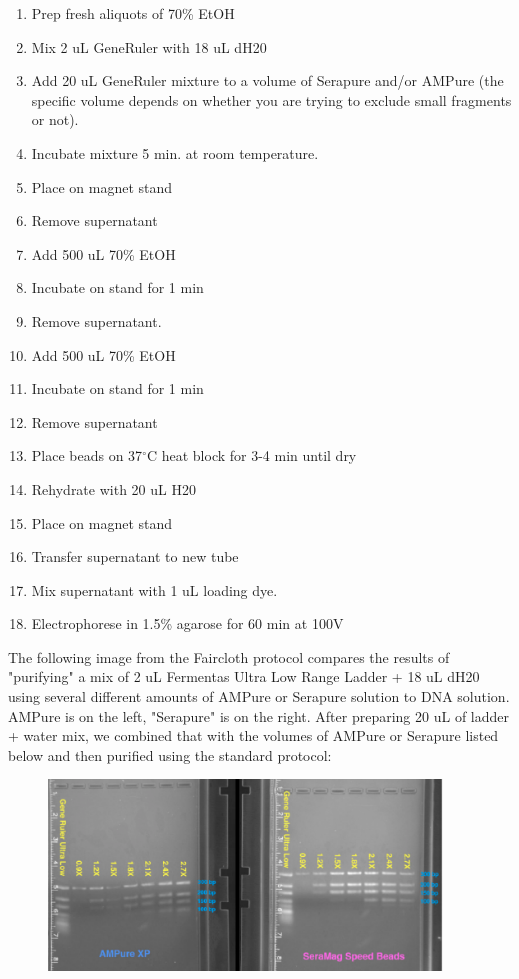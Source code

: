 \documentclass[11pt, oneside]{article}
\begin{document}
		\begin{enumerate}
			\itemsep0mm
			\item Prep fresh aliquots of 70\% EtOH
			\item Mix 2 uL GeneRuler with 18 uL dH20
			\item Add 20 uL GeneRuler mixture to a volume of Serapure and/or AMPure (the specific volume depends on whether you are trying to 				exclude small fragments or not). 
			\item Incubate mixture 5 min. at room temperature. 
			\item Place on magnet stand
			\item Remove supernatant
			\item Add 500 uL 70\% EtOH
			\item Incubate on stand for 1 min
			\item Remove supernatant. 
			\item Add 500 uL 70\% EtOH
			\item Incubate on stand for 1 min
			\item Remove supernatant
			\item Place beads on 37$^{\circ}$C heat block for 3-4 min until dry
			\item Rehydrate with 20 uL H20
			\item Place on magnet stand
			\item Transfer supernatant to new tube
			\item Mix supernatant with 1 uL loading dye. 
			\item Electrophorese in 1.5\% agarose for 60 min at 100V
		\end{enumerate}
		
		\vspace{3mm}
		
		\noindent The following image from the Faircloth protocol compares the results of "purifying" a mix of 2 uL Fermentas Ultra Low Range Ladder + 		18 uL dH20 using several different amounts of AMPure or Serapure solution to DNA solution. AMPure is on the left, "Serapure" is on the right. After 		preparing 20 uL of ladder + water mix, we combined that with the volumes of AMPure or Serapure listed below and then purified using the standard 		protocol: 
		
		\begin{figure}[H]
			\begin{center}
				\includegraphics[height=2in]{./images/SpeedBeads_gel.pdf}
			\end{center}
		\end{figure}
		
\end{document}
